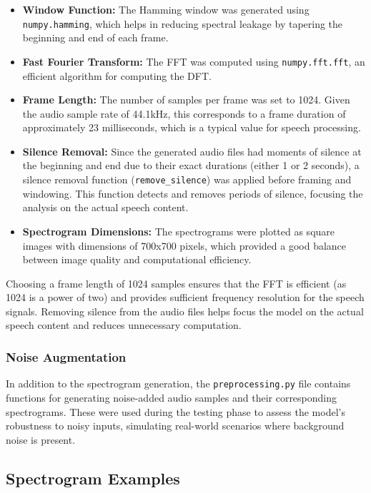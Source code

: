 \documentclass[12pt]{article}
\begin{document}
\begin{itemize}
\item \textbf{Window Function:} The Hamming window was generated using \texttt{numpy.hamming}, which helps in reducing spectral leakage by tapering the beginning and end of each frame.
\item \textbf{Fast Fourier Transform:} The FFT was computed using \texttt{numpy.fft.fft}, an efficient algorithm for computing the DFT.
\item \textbf{Frame Length:} The number of samples per frame was set to 1024. Given the audio sample rate of 44.1kHz, this corresponds to a frame duration of approximately 23 milliseconds, which is a typical value for speech processing.
\item \textbf{Silence Removal:} Since the generated audio files had moments of silence at the beginning and end due to their exact durations (either 1 or 2 seconds), a silence removal function (\verb|remove_silence|) was applied before framing and windowing. This function detects and removes periods of silence, focusing the analysis on the actual speech content.
\item \textbf{Spectrogram Dimensions:} The spectrograms were plotted as square images with dimensions of 700x700 pixels, which provided a good balance between image quality and computational efficiency.
\end{itemize}

Choosing a frame length of 1024 samples ensures that the FFT is efficient (as 1024 is a power of two) and provides sufficient frequency resolution for the speech signals. Removing silence from the audio files helps focus the model on the actual speech content and reduces unnecessary computation.

\subsubsection{Noise Augmentation}
\label{subsec:noise_augmentation}

In addition to the spectrogram generation, the \texttt{preprocessing.py} file contains functions for generating noise-added audio samples and their corresponding spectrograms. These were used during the testing phase to assess the model’s robustness to noisy inputs, simulating real-world scenarios where background noise is present.

\subsection{Spectrogram Examples}
\end{document}
